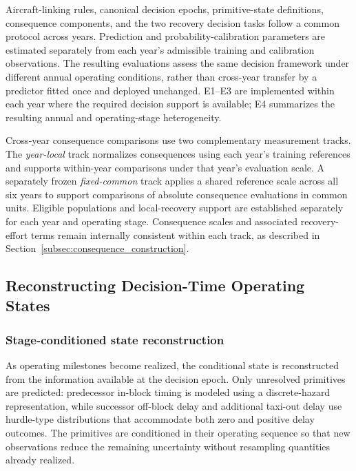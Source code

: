 Aircraft-linking rules, canonical decision epochs, primitive-state definitions, consequence components, and the two recovery decision tasks follow a common protocol across years. Prediction and probability-calibration parameters are estimated separately from each year's admissible training and calibration observations. The resulting evaluations assess the same decision framework under different annual operating conditions, rather than cross-year transfer by a predictor fitted once and deployed unchanged. E1--E3 are implemented within each year where the required decision support is available; E4 summarizes the resulting annual and operating-stage heterogeneity.

Cross-year consequence comparisons use two complementary measurement tracks. The \emph{year-local} track normalizes consequences using each year's training references and supports within-year comparisons under that year's evaluation scale. A separately frozen \emph{fixed-common} track applies a shared reference scale across all six years to support comparisons of absolute consequence evaluations in common units. Eligible populations and local-recovery support are established separately for each year and operating stage. Consequence scales and associated recovery-effort terms remain internally consistent within each track, as described in Section~\ref{subsec:consequence_construction}.

\subsection{Reconstructing Decision-Time Operating States}
\label{subsec:state_reconstruction}

\subsubsection{Stage-conditioned state reconstruction}

As operating milestones become realized, the conditional state is reconstructed from the information available at the decision epoch. Only unresolved primitives are predicted: predecessor in-block timing is modeled using a discrete-hazard representation, while successor off-block delay and additional taxi-out delay use hurdle-type distributions that accommodate both zero and positive delay outcomes. The primitives are conditioned in their operating sequence so that new observations reduce the remaining uncertainty without resampling quantities already realized.

